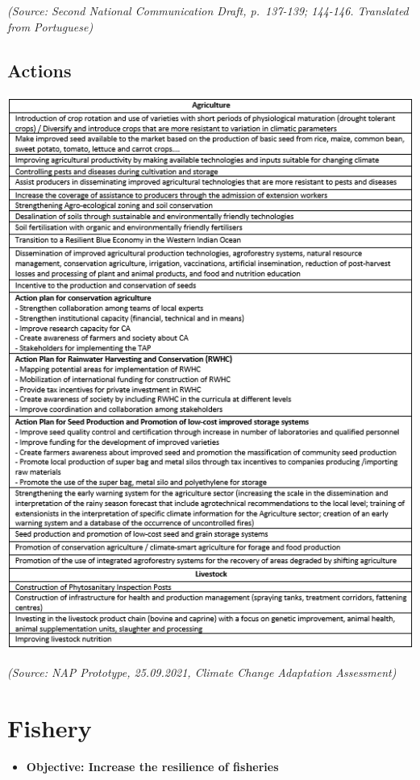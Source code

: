 \documentclass[
]{book}
\providecommand{\tightlist}{%
  \setlength{\itemsep}{0pt}\setlength{\parskip}{0pt}}
\begin{document}
\emph{(Source: Second National Communication Draft, p.~137-139; 144-146. Translated from Portuguese)}

\hypertarget{actions}{%
\subsection{Actions}\label{actions}}

\includegraphics{Figure30.png}

\emph{(Source: NAP Prototype, 25.09.2021, Climate Change Adaptation Assessment)}

\hypertarget{fishery}{%
\section{Fishery}\label{fishery}}

\begin{itemize}
\tightlist
\item
  \textbf{Objective: Increase the resilience of fisheries}
\end{itemize}
\end{document}
